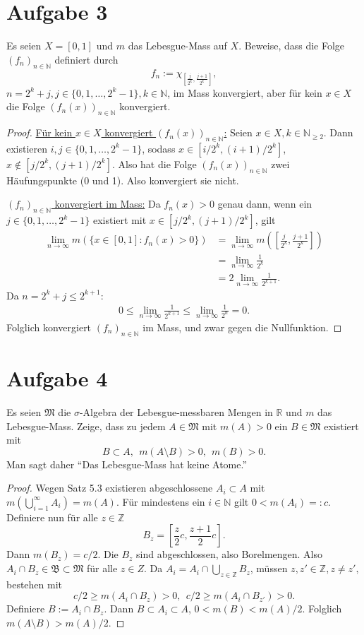 \documentclass[10pt]{article}\usepackage[]{graphicx}\usepackage[]{color}
\newcommand{\N}{\mathbb{N}}
\newcommand{\Z}{\mathbb{Z}}
\newcommand{\R}{\mathbb{R}}
\begin{document}
\section*{Aufgabe 3}
Es seien $X = [0,1]$ und
$m$ das Lebesgue-Mass auf $X$.
Beweise, dass die Folge $(f_n)_{n \in \N}$
definiert durch
\[
  f_n := \chi_{\left[\frac{j}{2^k}, \frac{j+1}{2^k}\right]},
\]
$n = 2^k + j, j \in \{0, 1, \dots, 2^k - 1\}, k \in \N$,
im Mass konvergiert, aber für kein $x \in X$ die Folge
$(f_n(x))_{n \in \N}$ konvergiert.

\begin{proof}
\uline{Für kein $x \in X$ konvergiert $(f_n(x))_{n \in \N}$:}
Seien $x \in X, k \in \N_{\geq 2}$.
Dann existieren $i,j \in \{0,1,\dots,2^k-1\}$,
sodass $x \in [i/2^k, (i+1)/2^k]$, $x \notin [j/2^k, (j+1)/2^k]$.
Also hat die Folge $(f_n(x))_{n \in \N}$ zwei Häufungspunkte (0 und 1).
Also konvergiert sie nicht.

\uline{$(f_n)_{n \in \N}$ konvergiert im Mass:}
Da $f_n(x) > 0$ genau dann, wenn ein $j \in \{0, 1, \dots, 2^k-1\}$
existiert mit $x \in [j/2^k, (j+1)/2^k]$, gilt
\begin{align*}
  \lim_{n \to \infty} m(\{x \in [0,1] : f_n(x) > 0\})
  &= \lim_{n \to \infty} m(\left[\frac{j}{2^k},\frac{j+1}{2^k}\right]) \\
  &= \lim_{n \to \infty} \frac{1}{2^k} \\
  &= 2 \lim_{n \to \infty} \frac{1}{2^{k+1}}.
\end{align*}
Da $n = 2^k + j \leq 2^{k+1}$:
\begin{align*}
  0 \leq \lim_{n \to \infty} \frac{1}{2^{k+1}}
  \leq \lim_{n \to \infty} \frac{1}{2^{n}}
  = 0.
\end{align*}
Folglich konvergiert $(f_n)_{n \in \N}$ im Mass, und zwar gegen die Nullfunktion.
\end{proof}

\section*{Aufgabe 4}
Es seien $\mathfrak{M}$ die $\sigma$-Algebra
der Lebesgue-messbaren Mengen in $\R$ und $m$
das Lebesgue-Mass. Zeige, dass zu jedem
$A \in \mathfrak{M}$ mit $m(A) > 0$ ein
$B \in \mathfrak{M}$ existiert mit
\[
  B \subset A, ~~ m(A \setminus B) > 0, ~~ m(B) > 0.
\]
Man sagt daher ``Das Lebesgue-Mass hat keine Atome.''
\begin{proof}
Wegen Satz 5.3 existieren abgeschlossene $A_i \subset A$
mit $m(\bigcup_{i = 1}^{\infty} A_i) = m(A)$.
Für mindestens ein $i \in \N$ gilt $0 < m(A_i) =: c$.
Definiere nun für alle $z \in \Z$
\[
  B_z = \left[\frac{z}{2}c, \frac{z+1}{2}c\right].
\]
Dann $m(B_z) = c/2$.
Die $B_z$ sind abgeschlossen, also Borelmengen.
Also $A_i \cap B_z \in \mathfrak{B} \subset \mathfrak{M}$ für alle $z \in Z$.
Da $A_i = A_i \cap \bigcup_{z \in \Z} B_z$,
müssen $z, z' \in \Z, z \neq z',$ bestehen mit
\[
  c/2 \geq m(A_i \cap B_z) > 0,~~ c/2 \geq m(A_i \cap B_{z'}) > 0.
\]
Definiere $B := A_i \cap B_z$. Dann $B \subset A_i \subset A$,
$0 < m(B) < m(A)/2$. Folglich $m(A\setminus B) > m(A)/2$.
\end{proof}
\end{document}
